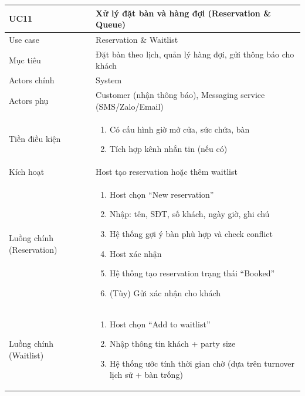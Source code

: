 \begin{longtable}{|>{\raggedright\arraybackslash}p{}|>{\raggedright\arraybackslash}p{}|}
\hline
\textbf{UC11} & \textbf{Xử lý đặt bàn và hàng đợi (Reservation \& Queue)} \\
\hline
Use case & Reservation \& Waitlist \\
\hline
Mục tiêu & Đặt bàn theo lịch, quản lý hàng đợi, gửi thông báo cho khách \\
\hline
Actors chính & System \\
\hline
Actors phụ & Customer (nhận thông báo), Messaging service (SMS/Zalo/Email) \\
\hline
Tiền điều kiện &
\vspace{-0.5em}
\begin{enumerate}[leftmargin=*]
\item Có cấu hình giờ mở cửa, sức chứa, bàn
\item Tích hợp kênh nhắn tin (nếu có)
\end{enumerate}
\vspace{-0.5em}
\\
\hline
Kích hoạt & Host tạo reservation hoặc thêm waitlist \\
\hline
Luồng chính (Reservation) &
\vspace{-0.5em}
\begin{enumerate}[leftmargin=*]
\item Host chọn “New reservation”
\item Nhập: tên, SĐT, số khách, ngày giờ, ghi chú
\item Hệ thống gợi ý bàn phù hợp và check conflict
\item Host xác nhận
\item Hệ thống tạo reservation trạng thái “Booked”
\item (Tùy) Gửi xác nhận cho khách
\end{enumerate}
\vspace{-0.5em}
\\
\hline
Luồng chính (Waitlist) &
\vspace{-0.5em}
\begin{enumerate}[leftmargin=*]
\item Host chọn “Add to waitlist”
\item Nhập thông tin khách + party size
\item Hệ thống ước tính thời gian chờ (dựa trên turnover lịch sử + bàn trống)

\end{enumerate}
\end{longtable}

